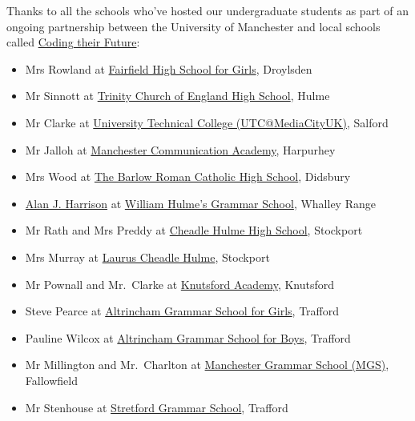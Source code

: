 \documentclass[
]{book}
\providecommand{\tightlist}{%
  \setlength{\itemsep}{0pt}\setlength{\parskip}{0pt}}
\begin{document}
Thanks to all the schools who've hosted our undergraduate students as part of an ongoing partnership between the University of Manchester and local schools called \href{https://personalpages.manchester.ac.uk/staff/duncan.hull/coding-their-future.html}{Coding their Future}:

\begin{itemize}
\tightlist
\item
  Mrs Rowland at \href{https://en.wikipedia.org/wiki/Fairfield_High_School_for_Girls}{Fairfield High School for Girls}, Droylsden
\item
  Mr Sinnott at \href{https://en.wikipedia.org/wiki/Trinity_Church_of_England_High_School}{Trinity Church of England High School}, Hulme
\item
  Mr Clarke at \href{https://en.wikipedia.org/wiki/Aldridge_UTC@MediaCityUK}{University Technical College (UTC@MediaCityUK)}, Salford
\item
  Mr Jalloh at \href{https://en.wikipedia.org/wiki/Manchester_Communication_Academy}{Manchester Communication Academy}, Harpurhey
\item
  Mrs Wood at \href{https://en.wikipedia.org/wiki/The_Barlow_Roman_Catholic_High_School}{The Barlow Roman Catholic High School}, Didsbury
\item
  \href{https://www.amazon.co.uk/Alan-J-Harrison/e/B09GTC2DR6/}{Alan J. Harrison} at \href{https://en.wikipedia.org/wiki/William_Hulme\%27s_Grammar_School}{William Hulme's Grammar School}, Whalley Range
\item
  Mr Rath and Mrs Preddy at \href{https://en.wikipedia.org/wiki/Cheadle_Hulme_High_School}{Cheadle Hulme High School}, Stockport
\item
  Mrs Murray at \href{https://www.lauruscheadlehulme.org.uk/}{Laurus Cheadle Hulme}, Stockport
\item
  Mr Pownall and Mr.~Clarke at \href{https://en.wikipedia.org/wiki/Knutsford_Academy}{Knutsford Academy}, Knutsford
\item
  Steve Pearce at \href{https://en.wikipedia.org/wiki/Altrincham_Grammar_School_for_Girls}{Altrincham Grammar School for Girls}, Trafford
\item
  Pauline Wilcox at \href{https://en.wikipedia.org/wiki/Altrincham_Grammar_School_for_Boys}{Altrincham Grammar School for Boys}, Trafford
\item
  Mr Millington and Mr.~Charlton at \href{https://en.wikipedia.org/wiki/Manchester_Grammar_School}{Manchester Grammar School (MGS)}, Fallowfield
\item
  Mr Stenhouse at \href{https://en.wikipedia.org/wiki/Stretford_Grammar_School}{Stretford Grammar School}, Trafford
\end{itemize}
\end{document}
